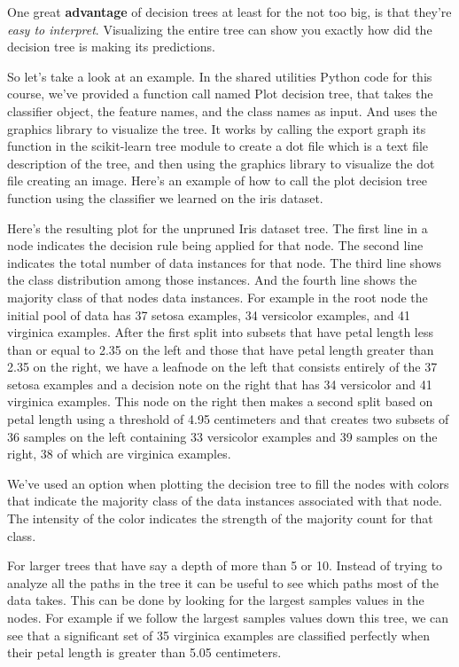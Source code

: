 \begin{multicols}{2}
One great \textbf{advantage} of decision trees at least for the not too big, is that they're \emph{easy to interpret}. Visualizing the entire tree can show you exactly how did the decision tree is making its predictions. 

So let's take a look at an example. In the shared utilities Python code for this course, we've provided a function call named Plot decision tree, that takes the classifier object, the feature names, and the class names as input. And uses the graphics library to visualize the tree. It works by calling the export graph its function in the scikit-learn tree module to create a dot file which is a text file description of the tree, and then using the graphics library to visualize the dot file creating an image. Here's an example of how to call the plot decision tree function using the classifier we learned on the iris dataset. 

Here's the resulting plot for the unpruned Iris dataset tree. The first line in a node indicates the decision rule being applied for that node. The second line indicates the total number of data instances for that node. The third line shows the class distribution among those instances. And the fourth line shows the majority class of that nodes data instances. For example in the root node the initial pool of data has 37 setosa examples, 34 versicolor examples, and 41 virginica examples. After the first split into subsets that have petal length less than or equal to 2.35 on the left and those that have petal length greater than 2.35 on the right, we have a leafnode on the left that consists entirely of the 37 setosa examples and a decision note on the right that has 34 versicolor and 41 virginica examples. This node on the right then makes a second split based on petal length using a threshold of 4.95 centimeters and that creates two subsets of 36 samples on the left containing 33 versicolor examples and 39 samples on the right, 38 of which are virginica examples. 

We've used an option when plotting the decision tree to fill the nodes with colors that indicate the majority class of the data instances associated with that node. The intensity of the color indicates the strength of the majority count for that class. 

For larger trees that have say a depth of more than 5 or 10. Instead of trying to analyze all the paths in the tree it can be useful to see which paths most of the data takes. This can be done by looking for the largest samples values in the nodes. For example if we follow the largest samples values down this tree, we can see that a significant set of 35 virginica examples are classified perfectly when their petal length is greater than 5.05 centimeters. 


\end{multicols}
